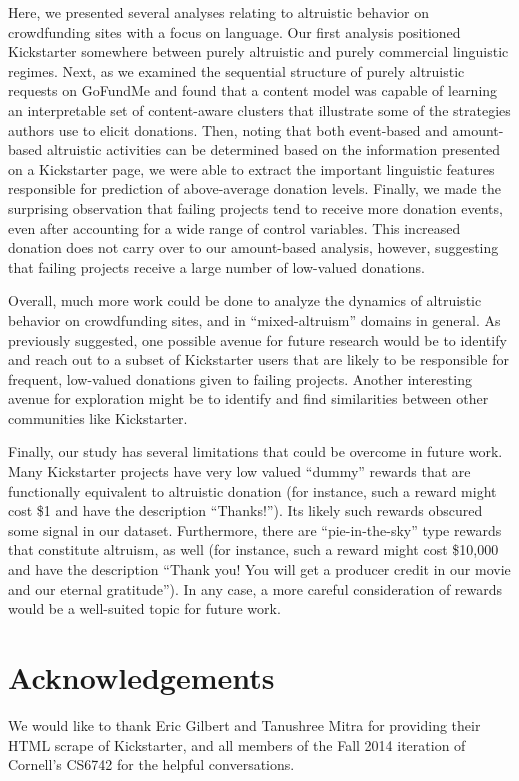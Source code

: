 \documentclass[letterpaper]{article}
\begin{document}
Here, we presented several analyses relating to altruistic behavior on crowdfunding sites with a focus on language. Our first analysis positioned Kickstarter somewhere between purely altruistic and purely commercial linguistic regimes. Next, as we examined the sequential structure of purely altruistic requests on GoFundMe and found that a content model was capable of learning an interpretable set of content-aware clusters that illustrate some of the strategies authors use to elicit donations. Then, noting that both event-based and amount-based altruistic activities can be determined based on the information presented on a Kickstarter page, we were able to extract the important linguistic features responsible for prediction of above-average donation levels. Finally, we made the surprising observation that failing projects tend to receive more donation events, even after accounting for a wide range of control variables. This increased donation does not carry over to our amount-based analysis, however, suggesting that failing projects receive a large number of low-valued donations.

Overall, much more work could be done to analyze the dynamics of altruistic behavior on crowdfunding sites, and in ``mixed-altruism'' domains in general. As previously suggested, one possible avenue for future research would be to identify and reach out to a subset of Kickstarter users that are likely to be responsible for frequent, low-valued donations given to failing projects. Another interesting avenue for exploration might be to identify and find similarities between other communities like Kickstarter.

Finally, our study has several limitations that could be overcome in future work. Many Kickstarter projects have very low valued ``dummy'' rewards that are functionally equivalent to altruistic donation (for instance, such a reward might cost \$1 and have the description ``Thanks!''). Its likely such rewards obscured some signal in our dataset. Furthermore, there are ``pie-in-the-sky'' type rewards that constitute altruism, as well (for instance, such a reward might cost \$10,000 and have the description ``Thank you! You will get a producer credit in our movie and our eternal gratitude''). In any case, a more careful consideration of rewards would be a well-suited topic for future work.

\section{Acknowledgements}

We would like to thank Eric Gilbert and Tanushree Mitra for providing their HTML scrape of Kickstarter, and all members of the Fall 2014 iteration of Cornell's CS6742 for the helpful conversations.

 
\end{document}
